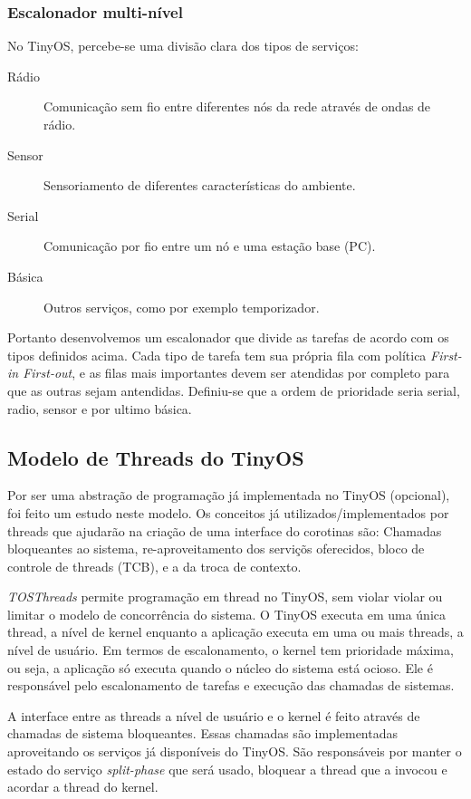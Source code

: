 \documentclass[a4paper,onecolumn, 10pt]{article}
\begin{document}
\subsubsection{Escalonador multi-nível}
No TinyOS, percebe-se uma divisão clara dos tipos de serviços: 
\begin{description}
    \item[Rádio] Comunicação sem fio entre diferentes nós da rede através de ondas de rádio.
    \item[Sensor] Sensoriamento de diferentes características do ambiente.
    \item[Serial] Comunicação por fio entre um nó e uma estação base (PC).
    \item[Básica] Outros serviços, como por exemplo temporizador.
\end{description}
Portanto desenvolvemos um escalonador que divide as tarefas de acordo com os tipos definidos acima.
Cada tipo de tarefa tem sua própria fila com política \textit{First-in First-out}, e as filas mais importantes devem ser
atendidas por completo para que as outras sejam antendidas.
Definiu-se que a ordem de prioridade seria serial, radio, sensor e por ultimo básica.

\subsection{Modelo de Threads do TinyOS}
Por ser uma abstração de programação já implementada no TinyOS (opcional), foi feito um estudo neste modelo.
Os conceitos já utilizados/implementados por threads que ajudarão na criação de uma interface do corotinas são: 
Chamadas bloqueantes ao sistema, re-aproveitamento dos serviçõs oferecidos, bloco de controle de threads (TCB), e
a da troca de contexto.

\textit{TOSThreads} permite programação em thread no TinyOS, sem violar violar ou limitar o modelo de concorrência do
sistema. O TinyOS executa em uma única thread, a nível de kernel enquanto a aplicação executa em uma ou mais threads, a nível de usuário.
Em termos de escalonamento, o kernel tem prioridade máxima, ou seja, a aplicação só executa quando o núcleo do sistema
está ocioso. Ele é responsável pelo escalonamento de tarefas e execução das chamadas de sistemas. 

A interface entre as threads a nível de usuário e o kernel é feito através de chamadas de sistema bloqueantes. Essas
chamadas são implementadas aproveitando os serviços já disponíveis do TinyOS. São responsáveis por manter o estado do serviço 
\textit{split-phase} que será usado, bloquear a thread que a invocou e acordar a thread do kernel.
\end{document}
